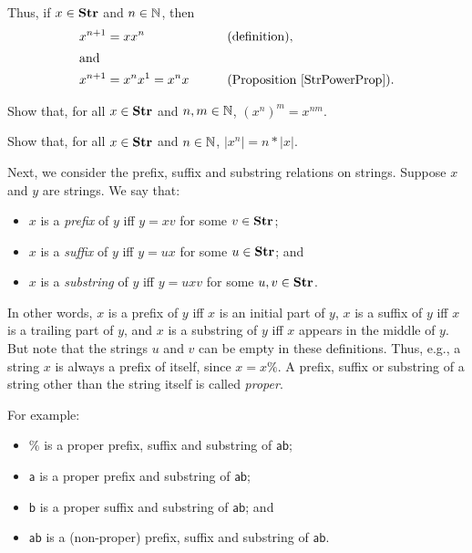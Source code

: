 Thus, if $x\in\mathbf{Str}$ and $n\in\mathbb{N}$, then
\begin{alignat*}{2}
x^{n+1} &= xx^n && \qquad{\textrm{(definition)}}, \\
\intertext{and}
x^{n+1} &= x^nx^1 = x^nx && \qquad{\textrm{(Proposition~\ref{StrPowerProp})}} .
\end{alignat*}

\begin{exercise}
Show that, for all $x\in\mathbf{Str}$ and $n,m\in\mathbb{N}$, $(x^n)^m = x^{nm}$.
\end{exercise}

\begin{exercise}
Show that, for all $x\in\mathbf{Str}$ and $n\in\mathbb{N}$, $|x^n| = n * |x|$.
\end{exercise}

Next, we consider the prefix, suffix and substring relations on
strings.  Suppose $x$ and $y$ are strings.  We say that:
\begin{itemize}
\item $x$ is a \emph{prefix} of $y$ iff $y=xv$ for some $v\in\mathbf{Str}$;
%
%

\item $x$ is a \emph{suffix} of $y$ iff $y=ux$ for some $u\in\mathbf{Str}$; and
%
%

\item $x$ is a \emph{substring} of $y$ iff $y=uxv$ for some $u,v\in\mathbf{Str}$.
%
%
\end{itemize}
In other words, $x$ is a prefix of $y$ iff $x$ is an initial part of
$y$, $x$ is a suffix of $y$ iff $x$ is a trailing part of $y$, and $x$
is a substring of $y$ iff $x$ appears in the middle of $y$.  But note
that the strings $u$ and $v$ can be empty in these definitions.  Thus,
e.g., a string $x$ is always a prefix of itself, since $x=x\%$.  A
prefix, suffix or substring of a string other than the string itself
is called \emph{proper}.
%
%
%
%
%
%
%
%
%

For example:
\begin{itemize}
\item $\%$ is a proper prefix, suffix and substring of
$\mathsf{ab}$;

\item $\mathsf{a}$ is a proper prefix and substring of
$\mathsf{ab}$;

\item $\mathsf{b}$ is a proper suffix and substring of
$\mathsf{ab}$; and

\item $\mathsf{ab}$ is a (non-proper) prefix, suffix and
substring of $\mathsf{ab}$.
\end{itemize}

